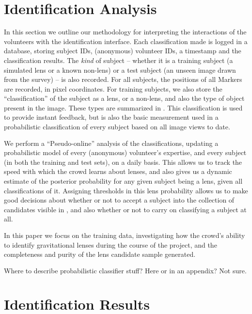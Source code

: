 \documentclass[useAMS,usenatbib,a4paper]{mn2e}
\begin{document}
\section{Identification Analysis}
\label{sec:IDanalysis}

In this section we outline our methodology for interpreting the
interactions of the volunteers with the identification interface.  Each
classification made is logged in a database, storing subject IDs,
(anonymous) volunteer IDs, a timestamp and the classification results. 
The {\it kind} of subject -- whether it is a training subject (a 
simulated lens or a known non-lens) or a test subject (an unseen image
drawn from the survey) -- is also recorded. For all subjects, the
positions of all Markers are recorded, in pixel coordinates. For
training subjects, we also store the ``classification'' of the subject
as a lens, or a non-lens, and also the type of object present in the
image. These types are summarized in . 
This classification is used to provide instant feedback, but is also the
basic measurement used in a probabilistic classification of every
subject based on all image views to date.

We perform a ``Pseudo-online'' analysis of the classifications, 
updating a probabilistic model of every (anonymous) volunteer's
expertise, and every subject (in both the training and test sets), on a
daily basis. This allows us to track the speed with which the crowd
learns about lenses, and also gives us a dynamic estimate of the
posterior probability for  any given  subject being a lens, given all
classifications of it. Assigning thresholds in this lens probability
allows us to make good decisions about whether or not to accept a
subject into the collection of candidates visible in \Talk, and also
whether or not to  carry on classifying a subject at all. 

In this paper we focus on the training data,  investigating  how the 
crowd's ability to identify gravitational lenses during the course of
the project, and the completeness and purity of the lens candidate
sample generated.

Where to describe probabilistic classifier stuff? Here or in an
appendix? Not sure.



\section{Identification Results}
\label{sec:IDresults}
\end{document}
